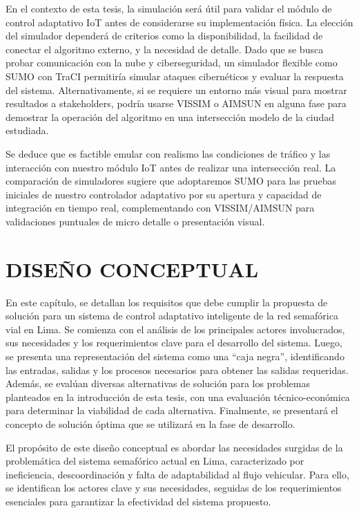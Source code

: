 \documentclass[12pt,a4paper,oneside]{report}
\begin{document}
En el contexto de esta tesis, la simulación será útil para validar el módulo de control adaptativo IoT antes de considerarse su implementación física. La elección del simulador dependerá de criterios como la disponibilidad, la facilidad de conectar el algoritmo externo, y la necesidad de detalle. Dado que se busca probar comunicación con la nube y ciberseguridad, un simulador flexible como SUMO con TraCI permitiría simular ataques cibernéticos y evaluar la respuesta del sistema. Alternativamente, si se requiere un entorno más visual para mostrar resultados a stakeholders, podría usarse VISSIM o AIMSUN en alguna fase para demostrar la operación del algoritmo en una intersección modelo de la ciudad estudiada.

Se deduce que es factible emular con realismo las condiciones de tráfico y las interacción con nuestro módulo IoT antes de realizar una intersección real. La comparación de simuladores sugiere que adoptaremos SUMO para las pruebas iniciales de nuestro controlador adaptativo por su apertura y capacidad de integración en tiempo real, complementando con VISSIM/AIMSUN para validaciones puntuales de micro detalle o presentación visual.

\chapter{DISEÑO CONCEPTUAL}\label{capuxedtulo-3-diseuxf1o-conceptual}

En este capítulo, se detallan los requisitos que debe cumplir la propuesta de solución para un sistema de control adaptativo inteligente de la red semafórica vial en Lima. Se comienza con el análisis de los principales actores involucrados, sus necesidades y los requerimientos clave para el desarrollo del sistema. Luego, se presenta una representación del sistema como una ``caja negra'', identificando las entradas, salidas y los procesos necesarios para obtener las salidas requeridas. Además, se evalúan diversas alternativas de solución para los problemas planteados en la introducción de esta tesis, con una evaluación técnico-económica para determinar la viabilidad de cada alternativa. Finalmente, se presentará el concepto de solución óptima que se utilizará en la fase de desarrollo.

El propósito de este diseño conceptual es abordar las necesidades surgidas de la problemática del sistema semafórico actual en Lima, caracterizado por ineficiencia, descoordinación y falta de adaptabilidad al flujo vehicular. Para ello, se identifican los actores clave y sus necesidades, seguidas de los requerimientos esenciales para garantizar la efectividad del sistema propuesto.
\end{document}
